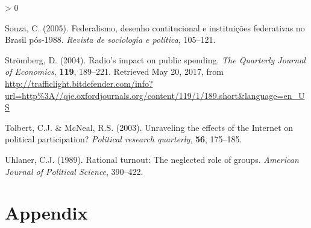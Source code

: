 \documentclass[
  12pt,
]{article}
\newlength{\cslhangindent}
\newenvironment{CSLReferences}[2] %
 {%
  \setlength{\parindent}{0pt}
  \ifodd #1 \everypar{\setlength{\hangindent}{\cslhangindent}}\ignorespaces\fi
  \ifnum #2 > 0
  \setlength{\parskip}{#2\baselineskip}
  \fi
 }%
 {}
\begin{document}
\begin{CSLReferences}{1}{0}
\leavevmode\hypertarget{ref-souza_federalismo_2005}{}%
Souza, C. (2005). Federalismo, desenho contitucional e instituições
federativas no {Brasil} pós-1988. \emph{Revista de sociologia e
política}, 105--121.

\leavevmode\hypertarget{ref-stromberg_radios_2004}{}%
Strömberg, D. (2004). Radio's impact on public spending. \emph{The
Quarterly Journal of Economics}, \textbf{119}, 189--221. Retrieved May
20, 2017, from
\url{http://trafficlight.bitdefender.com/info?url=http\%3A//qje.oxfordjournals.org/content/119/1/189.short\&language=en_US}

\leavevmode\hypertarget{ref-tolbert_unraveling_2003}{}%
Tolbert, C.J. \& McNeal, R.S. (2003). Unraveling the effects of the
{Internet} on political participation? \emph{Political research
quarterly}, \textbf{56}, 175--185.

\leavevmode\hypertarget{ref-uhlaner_rational_1989}{}%
Uhlaner, C.J. (1989). Rational turnout: {The} neglected role of groups.
\emph{American Journal of Political Science}, 390--422.

\end{CSLReferences}

\clearpage

\hypertarget{appendix}{%
\section*{Appendix}\label{appendix}}

\begingroup\fontsize{10}{12}\selectfont
\end{document}
